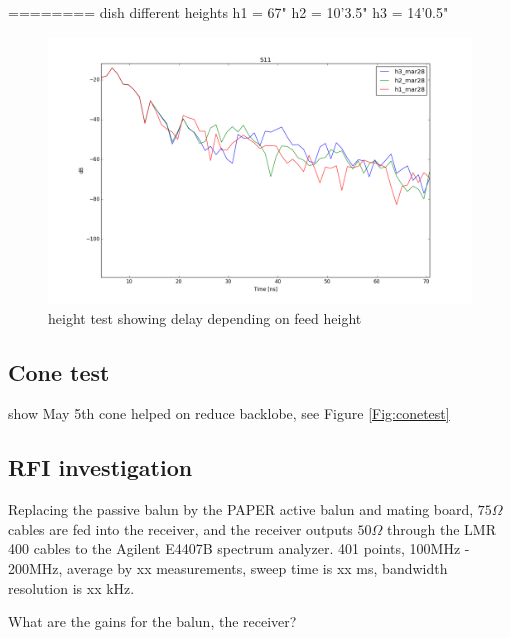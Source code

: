 \documentclass[preprint]{aastex}  %
\begin{document}
========
dish different heights
h1 = 67"
h2 = 10'3.5"
h3 = 14'0.5"

\begin{figure}[H]
	\begin{center}
	\includegraphics[width =\textwidth]{reflectometry_plots/Mar28/height_test_zoom}
	\caption{height test showing delay depending on feed height
\label{Fig:height_test} }
	\end{center}
\end{figure}



\subsection{Cone test}
show May 5th cone helped on reduce backlobe, see Figure \ref{Fig:conetest}

\subsection{RFI investigation}
Replacing the passive balun by the PAPER active balun and mating board, $75 \Omega$ cables are fed into the receiver, and the receiver outputs $50\Omega$ through the LMR 400 cables to the Agilent E4407B spectrum analyzer. 401 points, 100MHz - 200MHz, average by xx measurements, sweep time is xx ms, bandwidth resolution is xx kHz.

What are the gains for the balun, the receiver?
\end{document}
